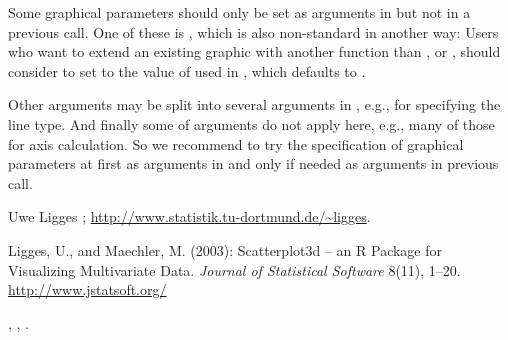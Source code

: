 \begin{Note}\relax
Some graphical parameters should only be set as arguments in
 but not in a previous  call.  One of these is
, which is also non-standard in another way: Users who
want to extend an existing  graphic with another function than
,  or , should consider to
set  to the value of  used in
, which defaults to .

Other  arguments may be split into several arguments in
, e.g., for specifying the line type.  And finally
some of  arguments do not apply here, e.g., many of those
for axis calculation.  So we recommend to try the specification of
graphical parameters at first as arguments in  and
only if needed as arguments in previous  call.
\end{Note}
\begin{Author}\relax
Uwe Ligges ;
\url{http://www.statistik.tu-dortmund.de/~ligges}.
\end{Author}
\begin{References}\relax
Ligges, U., and Maechler, M. (2003):
Scatterplot3d -- an R Package for Visualizing Multivariate Data.
\emph{Journal of Statistical Software} 8(11), 1--20.
\url{http://www.jstatsoft.org/}
\end{References}
\begin{SeeAlso}\relax
{}, , .
\end{SeeAlso}

